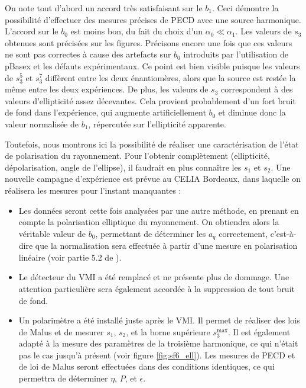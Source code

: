 On note tout d'abord un accord très satisfaisant sur le $b_1$. Ceci démontre la possibilité d'effectuer des mesures précises de PECD avec une source harmonique. L'accord sur le $b_0$ est moins bon, du fait du choix d'un $\alpha_0\ll\alpha_1$. Les valeurs de $s_3$ obtenues sont précisées sur les figures. Précisons encore une fois que ces valeurs ne sont pas correctes à cause des artefacts sur $b_0$ introduits par l'utilisation de pBasex et les défauts expérimentaux. Ce point est bien visible puisque les valeurs de $s_3^5$ et $s_3^7$ diffèrent entre les deux énantiomères, alors que la source est restée la même entre les deux expériences. De plus, les valeurs de $s_3$ correspondent à des valeurs d'ellipticité assez décevantes. Cela provient probablement d'un fort bruit de fond dans l'expérience, qui augmente artificiellement $b_0$ et diminue donc la valeur normalisée de $b_1$, répercutée sur l'ellipticité apparente.\par
Toutefois, nous montrons ici la possibilité de réaliser une caractérisation de l'état de polarisation du rayonnement. Pour l'obtenir complètement (ellipticité, dépolarisation, angle de l'ellipse), il faudrait en plus connaître les $s_1$ et $s_2$. Une nouvelle campagne d'expérience est prévue au CELIA Bordeaux, dans laquelle on réalisera les mesures pour l'instant manquantes :


\begin{itemize}
\renewcommand{\labelitemi}{$\bullet$}
\setlength\itemsep{1em}
\item Les données seront cette fois analysées par une autre méthode, en prenant en compte la polarisation elliptique du rayonnement. On obtiendra alors la véritable valeur de $b_0$, permettant de déterminer les $a_q$ correctement, c'est-à-dire que la normalisation sera effectuée à partir d'une mesure en polarisation linéaire (voir partie 5.2 de ).
\item Le détecteur du VMI a été remplacé et ne présente plus de dommage. Une attention particulière sera également accordée à la suppression de tout bruit de fond.
\item Un polarimètre a été installé juste après le VMI. Il permet de réaliser des lois de Malus et de mesurer $s_1$, $s_2$, et la borne supérieure $s_3^{\text{max}}$. Il est également adapté à la mesure des paramètres de la troisième harmonique, ce qui n'était pas le cas jusqu'à présent (voir figure \ref{fig:sf6_ell}). Les mesures de PECD et de loi de Malus seront effectuées dans des conditions identiques, ce qui permettra de déterminer $\eta$, $P$, et $\epsilon$. 
\end{itemize}
\newpage
